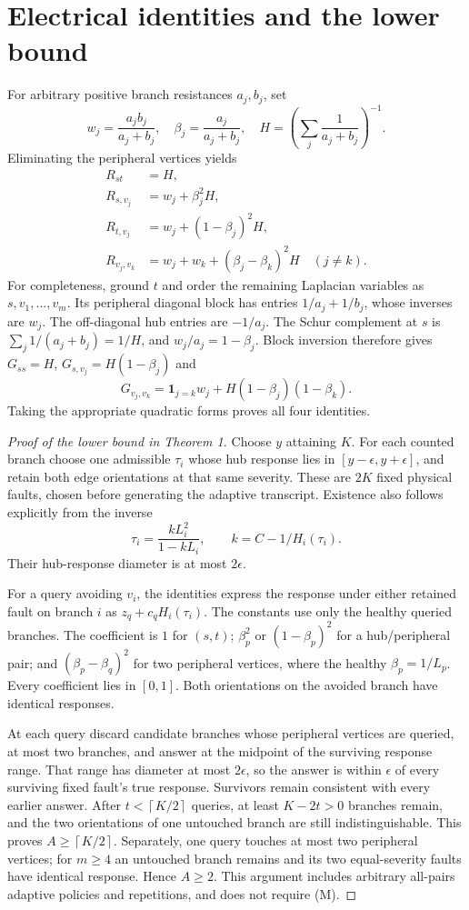 \documentclass[11pt,letterpaper]{article}
\newcommand{\ceil}[1]{\left\lceil #1\right\rceil}
\begin{document}
\section{Electrical identities and the lower bound}
For arbitrary positive branch resistances $a_j,b_j$, set
\[
 w_j=\frac{a_jb_j}{a_j+b_j},\quad \beta_j=\frac{a_j}{a_j+b_j},\quad
 H=\left(\sum_j\frac1{a_j+b_j}\right)^{-1}.
\]
Eliminating the peripheral vertices yields
\[
 \begin{aligned}
 R_{st}&=H,\\
 R_{s,v_j}&=w_j+\beta_j^2H,\\
 R_{t,v_j}&=w_j+(1-\beta_j)^2H,\\
 R_{v_j,v_k}&=w_j+w_k+(\beta_j-\beta_k)^2H\quad(j\ne k).
 \end{aligned}
\]
For completeness, ground $t$ and order the remaining Laplacian variables as $s,v_1,\ldots,v_m$. Its peripheral diagonal block has entries $1/a_j+1/b_j$, whose inverses are $w_j$. The off-diagonal hub entries are $-1/a_j$. The Schur complement at $s$ is $\sum_j1/(a_j+b_j)=1/H$, and $w_j/a_j=1-\beta_j$. Block inversion therefore gives $G_{ss}=H$, $G_{s,v_j}=H(1-\beta_j)$ and
\[
 G_{v_j,v_k}=\mathbf1_{j=k}w_j+H(1-\beta_j)(1-\beta_k).
\]
Taking the appropriate quadratic forms proves all four identities.

\begin{proof}[Proof of the lower bound in Theorem 1]
Choose $y$ attaining $K$. For each counted branch choose one admissible $\tau_i$ whose hub response lies in $[y-\epsilon,y+\epsilon]$, and retain both edge orientations at that same severity. These are $2K$ fixed physical faults, chosen before generating the adaptive transcript. Existence also follows explicitly from the inverse
\[
 \tau_i=\frac{kL_i^2}{1-kL_i},\qquad k=C-1/H_i(\tau_i).
\]
Their hub-response diameter is at most $2\epsilon$.

For a query avoiding $v_i$, the identities express the response under either retained fault on branch $i$ as $z_q+c_qH_i(\tau_i)$. The constants use only the healthy queried branches. The coefficient is $1$ for $(s,t)$; $\beta_p^2$ or $(1-\beta_p)^2$ for a hub/peripheral pair; and $(\beta_p-\beta_q)^2$ for two peripheral vertices, where the healthy $\beta_p=1/L_p$. Every coefficient lies in $[0,1]$. Both orientations on the avoided branch have identical responses.

At each query discard candidate branches whose peripheral vertices are queried, at most two branches, and answer at the midpoint of the surviving response range. That range has diameter at most $2\epsilon$, so the answer is within $\epsilon$ of every surviving fixed fault's true response. Survivors remain consistent with every earlier answer. After $t<\ceil{K/2}$ queries, at least $K-2t>0$ branches remain, and the two orientations of one untouched branch are still indistinguishable. This proves $A\ge\ceil{K/2}$. Separately, one query touches at most two peripheral vertices; for $m\ge4$ an untouched branch remains and its two equal-severity faults have identical response. Hence $A\ge2$. This argument includes arbitrary all-pairs adaptive policies and repetitions, and does not require (M).
\end{proof}
\end{document}
